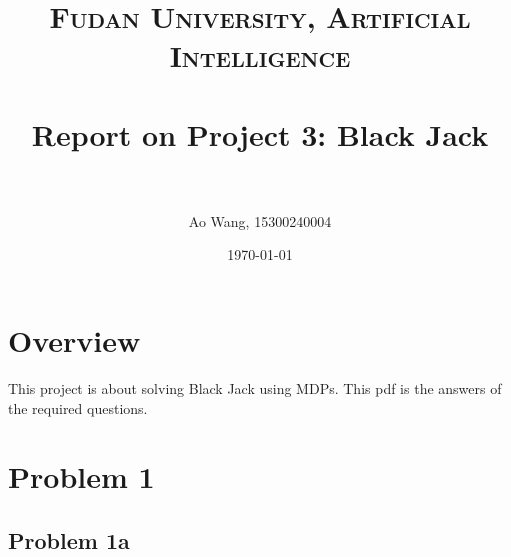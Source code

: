 \documentclass[paper=a4, fontsize=12pt]{scrartcl} %
\title{	
\normalfont \normalsize 
\textsc{Fudan University, Artificial Intelligence} \\ [0pt] %
\horrule{1pt} \\[0.4cm] %
\LARGE Report on Project 3: Black Jack \\ %
\horrule{1pt} \\[0cm] %
}
\author{Ao Wang, 15300240004} %
\date{\normalsize\today} %
\numberwithin{equation}{section} %
\numberwithin{figure}{section} %
\numberwithin{table}{section} %
\begin{document}
\begin{spacing}{1.1}

\maketitle %

\section{Overview}
This project is about solving Black Jack using MDPs. This pdf is the answers of the required questions.

\section{Problem 1}
\subsection{Problem 1a}



\end{spacing}
\end{document}
